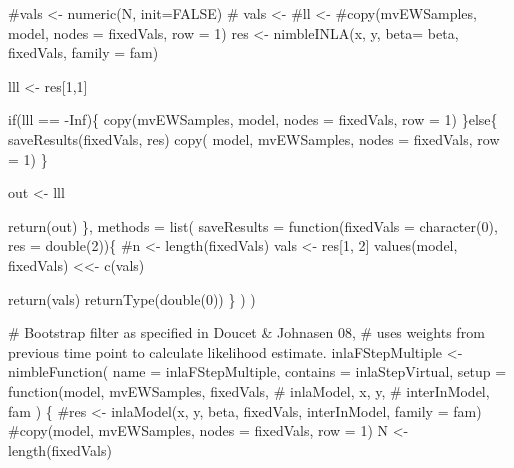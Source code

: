 \documentclass[
]{article}
\newenvironment{Shaded}{\begin{snugshade}}{\end{snugshade}}
\newcommand{\AttributeTok}[1]{\textcolor[rgb]{0.40,0.45,0.13}{#1}}
\newcommand{\CommentTok}[1]{\textcolor[rgb]{0.37,0.37,0.37}{#1}}
\newcommand{\ConstantTok}[1]{\textcolor[rgb]{0.56,0.35,0.01}{#1}}
\newcommand{\ControlFlowTok}[1]{\textcolor[rgb]{0.00,0.23,0.31}{#1}}
\newcommand{\DecValTok}[1]{\textcolor[rgb]{0.68,0.00,0.00}{#1}}
\newcommand{\FunctionTok}[1]{\textcolor[rgb]{0.28,0.35,0.67}{#1}}
\newcommand{\NormalTok}[1]{\textcolor[rgb]{0.00,0.23,0.31}{#1}}
\newcommand{\OtherTok}[1]{\textcolor[rgb]{0.00,0.23,0.31}{#1}}
\newcommand{\SpecialCharTok}[1]{\textcolor[rgb]{0.37,0.37,0.37}{#1}}
\newcommand{\StringTok}[1]{\textcolor[rgb]{0.13,0.47,0.30}{#1}}
\begin{document}
\begin{Shaded}
\begin{Highlighting}[]
    \CommentTok{\#vals \textless{}{-} numeric(N, init=FALSE)}
   \CommentTok{\# vals \textless{}{-}}
    \CommentTok{\#ll \textless{}{-}}
    \CommentTok{\#copy(mvEWSamples, model, nodes = fixedVals, row = 1)}
\NormalTok{    res }\OtherTok{\textless{}{-}} \FunctionTok{nimbleINLA}\NormalTok{(x, y, }\AttributeTok{beta=}\NormalTok{ beta, fixedVals,  }\AttributeTok{family =}\NormalTok{ fam)}

\NormalTok{    lll }\OtherTok{\textless{}{-}}\NormalTok{ res[}\DecValTok{1}\NormalTok{,}\DecValTok{1}\NormalTok{]}

   \ControlFlowTok{if}\NormalTok{(lll }\SpecialCharTok{==} \SpecialCharTok{{-}}\ConstantTok{Inf}\NormalTok{)\{}
     \FunctionTok{copy}\NormalTok{(mvEWSamples, model, }\AttributeTok{nodes =}\NormalTok{ fixedVals, }\AttributeTok{row =} \DecValTok{1}\NormalTok{)}
\NormalTok{   \}}\ControlFlowTok{else}\NormalTok{\{}
     \FunctionTok{saveResults}\NormalTok{(fixedVals, res)}
     \FunctionTok{copy}\NormalTok{( model, mvEWSamples, }\AttributeTok{nodes =}\NormalTok{ fixedVals, }\AttributeTok{row =} \DecValTok{1}\NormalTok{)}
\NormalTok{   \}}

\NormalTok{      out }\OtherTok{\textless{}{-}}\NormalTok{ lll}

    \FunctionTok{return}\NormalTok{(out)}
\NormalTok{  \},}
\AttributeTok{methods =} \FunctionTok{list}\NormalTok{(}
\AttributeTok{saveResults =} \ControlFlowTok{function}\NormalTok{(}\AttributeTok{fixedVals =} \FunctionTok{character}\NormalTok{(}\DecValTok{0}\NormalTok{),}
                       \AttributeTok{res =} \FunctionTok{double}\NormalTok{(}\DecValTok{2}\NormalTok{))\{}
  \CommentTok{\#n \textless{}{-} length(fixedVals)}
\NormalTok{  vals }\OtherTok{\textless{}{-}}\NormalTok{ res[}\DecValTok{1}\NormalTok{, }\DecValTok{2}\NormalTok{]}
  \FunctionTok{values}\NormalTok{(model, fixedVals) }\OtherTok{\textless{}\textless{}{-}} \FunctionTok{c}\NormalTok{(vals)}
  
  \FunctionTok{return}\NormalTok{(vals)}
  \FunctionTok{returnType}\NormalTok{(}\FunctionTok{double}\NormalTok{(}\DecValTok{0}\NormalTok{))}
\NormalTok{\}}
\NormalTok{)}
\NormalTok{)}


\CommentTok{\# Bootstrap filter as specified in Doucet \& Johnasen \textquotesingle{}08,}
\CommentTok{\# uses weights from previous time point to calculate likelihood estimate.}
\NormalTok{inlaFStepMultiple }\OtherTok{\textless{}{-}} \FunctionTok{nimbleFunction}\NormalTok{(}
  \AttributeTok{name =} \StringTok{\textquotesingle{}inlaFStepMultiple\textquotesingle{}}\NormalTok{,}
  \AttributeTok{contains =}\NormalTok{ inlaStepVirtual,}
  \AttributeTok{setup =} \ControlFlowTok{function}\NormalTok{(model,}
\NormalTok{                   mvEWSamples,}
\NormalTok{                   fixedVals,}
                   \CommentTok{\# inlaModel,}
\NormalTok{                   x,}
\NormalTok{                   y,}
                   \CommentTok{\# interInModel,}
\NormalTok{                   fam}
\NormalTok{  ) \{}
    \CommentTok{\#res \textless{}{-} inlaModel(x, y, beta, fixedVals, interInModel, family = fam)}
    \CommentTok{\#copy(model, mvEWSamples, nodes = fixedVals, row = 1)}
\NormalTok{    N }\OtherTok{\textless{}{-}} \FunctionTok{length}\NormalTok{(fixedVals)}


\end{Highlighting}
\end{Shaded}
\end{document}
